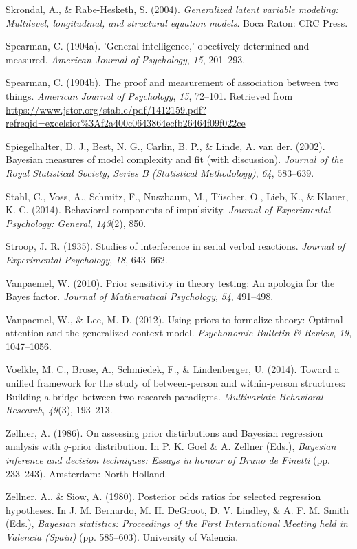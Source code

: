 \documentclass[english,man]{apa6}
\theoremstyle{definition}
\theoremstyle{definition}
\theoremstyle{definition}
\theoremstyle{remark}
\begin{document}
\hypertarget{ref-Skrondal:Rabe-Hesketh:2004}{}
Skrondal, A., \& Rabe-Hesketh, S. (2004). \emph{Generalized latent
variable modeling: Multilevel, longitudinal, and structural equation
models}. Boca Raton: CRC Press.

\hypertarget{ref-Spearman:1904}{}
Spearman, C. (1904a). 'General intelligence,' obectively determined and
measured. \emph{American Journal of Psychology}, \emph{15}, 201--293.

\hypertarget{ref-Spearman:1904a}{}
Spearman, C. (1904b). The proof and measurement of association between
two things. \emph{American Journal of Psychology}, \emph{15}, 72--101.
Retrieved from
\url{https://www.jstor.org/stable/pdf/1412159.pdf?refreqid=excelsior\%3Af2a400c0643864ecfb26464f09f022ce}

\hypertarget{ref-Spiegelhalter:etal:2002}{}
Spiegelhalter, D. J., Best, N. G., Carlin, B. P., \& Linde, A. van der.
(2002). Bayesian measures of model complexity and fit (with discussion).
\emph{Journal of the Royal Statistical Society, Series B (Statistical
Methodology)}, \emph{64}, 583--639.

\hypertarget{ref-Stahl:etal:2014}{}
Stahl, C., Voss, A., Schmitz, F., Nuszbaum, M., Tüscher, O., Lieb, K.,
\& Klauer, K. C. (2014). Behavioral components of impulsivity.
\emph{Journal of Experimental Psychology: General}, \emph{143}(2), 850.

\hypertarget{ref-Stroop:1935}{}
Stroop, J. R. (1935). Studies of interference in serial verbal
reactions. \emph{Journal of Experimental Psychology}, \emph{18},
643--662.

\hypertarget{ref-Vanpaemel:2010}{}
Vanpaemel, W. (2010). Prior sensitivity in theory testing: An apologia
for the Bayes factor. \emph{Journal of Mathematical Psychology},
\emph{54}, 491--498.

\hypertarget{ref-Vanpaemel:Lee:2012}{}
Vanpaemel, W., \& Lee, M. D. (2012). Using priors to formalize theory:
Optimal attention and the generalized context model. \emph{Psychonomic
Bulletin \& Review}, \emph{19}, 1047--1056.

\hypertarget{ref-Voelkle:etal:2014}{}
Voelkle, M. C., Brose, A., Schmiedek, F., \& Lindenberger, U. (2014).
Toward a unified framework for the study of between-person and
within-person structures: Building a bridge between two research
paradigms. \emph{Multivariate Behavioral Research}, \emph{49}(3),
193--213.

\hypertarget{ref-Zellner:1986}{}
Zellner, A. (1986). On assessing prior distirbutions and Bayesian
regression analysis with \(g\)-prior distribution. In P. K. Goel \& A.
Zellner (Eds.), \emph{Bayesian inference and decision techniques: Essays
in honour of Bruno de Finetti} (pp. 233--243). Amsterdam: North Holland.

\hypertarget{ref-Zellner:Siow:1980}{}
Zellner, A., \& Siow, A. (1980). Posterior odds ratios for selected
regression hypotheses. In J. M. Bernardo, M. H. DeGroot, D. V. Lindley,
\& A. F. M. Smith (Eds.), \emph{Bayesian statistics: Proceedings of the
First International Meeting held in Valencia (Spain)} (pp. 585--603).
University of Valencia.

\endgroup
\end{document}
